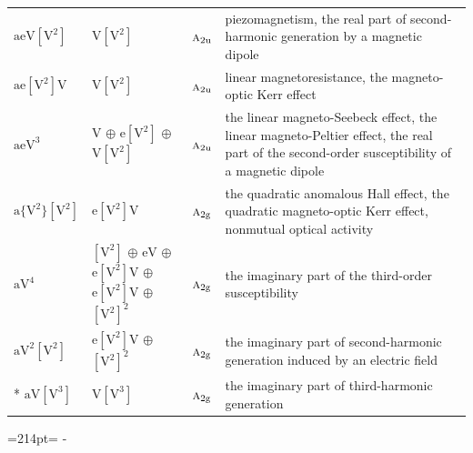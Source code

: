 \documentclass[10pt,a4paper]{article}
\newcommand{\needspace}[1]{\par\penalty-100\begingroup\dimen0=#1\relax\dimen2=\pagegoal
  \advance\dimen2-\pagetotal\ifdim\dimen0>\dimen2\relax\ifdim\dimen2>0pt\vfil\break\fi\fi
  \endgroup}
\numberwithin{equation}{section}
\newcommand{\irr}[1]{\text{\normalfont\scshape #1}}
\newcommand{\ptag}[1]{\mathrm{#1}}
\newcommand{\jahn}[1]{\mathrm{#1}}
\newlength{\fillwidth}\newlength{\cellwidth}\newlength{\colwidth}
\begin{document}
{\begin{longtable}{@{}lll>{\RaggedRight\arraybackslash}p{\fillwidth}@{}}
$\jahn{aeV[V^{2}]}$ & $\jahn{V[V^{2}]}$ & $\irr{a}_{2\ptag{u}}$ & piezomagnetism, the real part of second-harmonic generation by a magnetic dipole\\
$\jahn{ae[V^{2}]V}$ & $\jahn{V[V^{2}]}$ & $\irr{a}_{2\ptag{u}}$ & linear magnetoresistance, the magneto-optic Kerr effect\\
$\jahn{aeV^{3}}$ & $\jahn{V}$ $\oplus$ $\jahn{e[V^{2}]}$ $\oplus$ $\jahn{V[V^{2}]}$ & $\irr{a}_{2\ptag{u}}$ & the linear magneto-Seebeck effect, the linear magneto-Peltier effect, the real part of the second-order susceptibility of a magnetic dipole\\
$\jahn{a\{V^{2}\}[V^{2}]}$ & $\jahn{e[V^{2}]V}$ & $\irr{a}_{2\ptag{g}}$ & the quadratic anomalous Hall effect, the quadratic magneto-optic Kerr effect, nonmutual optical activity\\
$\jahn{aV^{4}}$ & $\jahn{[V^{2}]}$ $\oplus$ $\jahn{eV}$ $\oplus$ $\jahn{e[V^{2}]V}$ $\oplus$ $\jahn{e[V^{2}]V}$ $\oplus$ $\jahn{[V^{2}]^{2}}$ & $\irr{a}_{2\ptag{g}}$ & the imaginary part of the third-order susceptibility\\
$\jahn{aV^{2}[V^{2}]}$ & $\jahn{e[V^{2}]V}$ $\oplus$ $\jahn{[V^{2}]^{2}}$ & $\irr{a}_{2\ptag{g}}$ & the imaginary part of second-harmonic generation induced by an electric field\\*
$\jahn{aV[V^{3}]}$ & $\jahn{V[V^{3}]}$ & $\irr{a}_{2\ptag{g}}$ & the imaginary part of third-harmonic generation\\
\bottomrule\end{longtable}}
\needspace{214pt}
\end{document}
